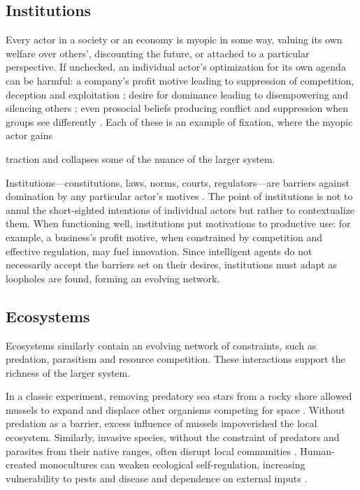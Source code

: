 \documentclass[11pt]{article}
\newif\ifmarkchanges
\newcommand{\del}[2][]{%
  \if\relax\detokenize{#1}\relax\else\leavevmode\linelabel{#1:a}\fi
  \ifmarkchanges{\color{red}\sout{#2}}\fi
  \if\relax\detokenize{#1}\relax\else\linelabel{#1:b}\fi}
\begin{document}
\subsection*{Institutions}

Every actor in a society or an economy is myopic in some way, valuing its own welfare over others', discounting the future, or attached to a particular perspective. If unchecked, an individual actor's optimization for its own agenda can be harmful: a company's profit motive leading to suppression of competition, deception and exploitation \citep{bakan2006corporation}; desire for dominance leading to disempowering and silencing others \citep{sidanius2001social}; even prosocial beliefs producing conflict and suppression when groups see differently \citep{haidt2012righteous}. Each of these is an example of fixation, where the myopic actor gains \del[toomuch]{too much }traction and collapses some of the nuance of the larger system.

Institutions---constitutions, laws, norms, courts, regulators---are barriers against domination by any particular actor's motives \citep{north1990institutions, ostrom1990governing, leibo2025societal}. The point of institutions is not to annul the short-sighted intentions of individual actors but rather to contextualize them. When functioning well, institutions put motivations to productive use: for example, a business's profit motive, when constrained by competition and effective regulation, may fuel innovation. Since intelligent agents do not necessarily accept the barriers set on their desires, institutions must adapt as loopholes are found, forming an evolving network.




\subsection*{Ecosystems}

Ecosystems similarly contain an evolving network of constraints, such as predation, parasitism and resource competition. These interactions support the richness of the larger system. 

In a classic experiment, removing predatory sea stars from a rocky shore allowed mussels to expand and displace other organisms competing for space \citep{paine1966food}. Without predation as a barrier, excess influence of mussels impoverished the local ecosystem. Similarly, invasive species, without the constraint of predators and parasites from their native ranges, often disrupt local communities \citep{elton1958ecology}. Human-created monocultures can weaken ecological self-regulation, increasing vulnerability to pests and disease and dependence on external inputs \citep{altieri1999ecological,matson1997agricultural}. 
\end{document}
